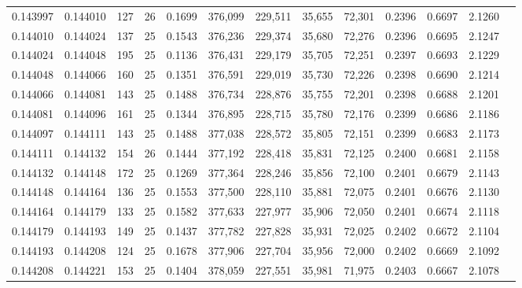 \begin{tabular}{rrrrrrrrrrrrr}
0.143997 & 0.144010 &   127 &  26 &                                     0.1699 & 376,099 & 229,511 &  35,655 &  72,301 & 0.2396 & 0.6697 & 2.1260 \\
0.144010 & 0.144024 &   137 &  25 &                                     0.1543 & 376,236 & 229,374 &  35,680 &  72,276 & 0.2396 & 0.6695 & 2.1247 \\
0.144024 & 0.144048 &   195 &  25 &                                     0.1136 & 376,431 & 229,179 &  35,705 &  72,251 & 0.2397 & 0.6693 & 2.1229 \\
0.144048 & 0.144066 &   160 &  25 &                                     0.1351 & 376,591 & 229,019 &  35,730 &  72,226 & 0.2398 & 0.6690 & 2.1214 \\
0.144066 & 0.144081 &   143 &  25 &                                     0.1488 & 376,734 & 228,876 &  35,755 &  72,201 & 0.2398 & 0.6688 & 2.1201 \\
0.144081 & 0.144096 &   161 &  25 &                                     0.1344 & 376,895 & 228,715 &  35,780 &  72,176 & 0.2399 & 0.6686 & 2.1186 \\
0.144097 & 0.144111 &   143 &  25 &                                     0.1488 & 377,038 & 228,572 &  35,805 &  72,151 & 0.2399 & 0.6683 & 2.1173 \\
0.144111 & 0.144132 &   154 &  26 &                                     0.1444 & 377,192 & 228,418 &  35,831 &  72,125 & 0.2400 & 0.6681 & 2.1158 \\
0.144132 & 0.144148 &   172 &  25 &                                     0.1269 & 377,364 & 228,246 &  35,856 &  72,100 & 0.2401 & 0.6679 & 2.1143 \\
0.144148 & 0.144164 &   136 &  25 &                                     0.1553 & 377,500 & 228,110 &  35,881 &  72,075 & 0.2401 & 0.6676 & 2.1130 \\
0.144164 & 0.144179 &   133 &  25 &                                     0.1582 & 377,633 & 227,977 &  35,906 &  72,050 & 0.2401 & 0.6674 & 2.1118 \\
0.144179 & 0.144193 &   149 &  25 &                                     0.1437 & 377,782 & 227,828 &  35,931 &  72,025 & 0.2402 & 0.6672 & 2.1104 \\
0.144193 & 0.144208 &   124 &  25 &                                     0.1678 & 377,906 & 227,704 &  35,956 &  72,000 & 0.2402 & 0.6669 & 2.1092 \\
0.144208 & 0.144221 &   153 &  25 &                                     0.1404 & 378,059 & 227,551 &  35,981 &  71,975 & 0.2403 & 0.6667 & 2.1078 \\

\end{tabular}
